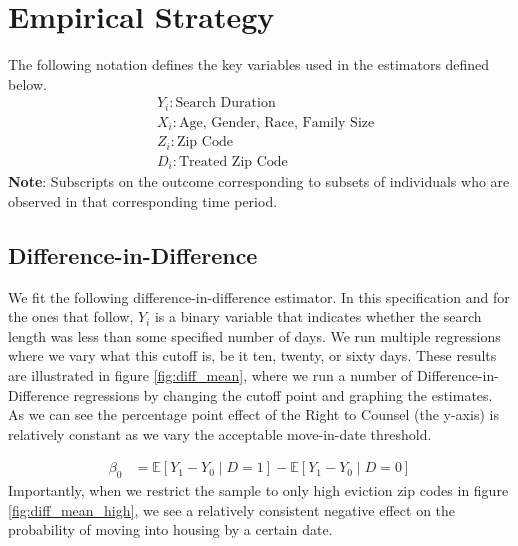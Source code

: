 \documentclass[a4paper,12pt]{article}
\begin{document}
 




\section{Empirical Strategy}
The following notation defines the key variables used in the estimators defined below. 
\begin{align*}
    &Y_i:  \textrm{Search Duration}\\
    &X_i: \textrm{Age, Gender, Race, Family Size}\\ 
    &Z_i: \textrm{Zip Code} \\
    &D_i: \textrm{Treated Zip Code}
\end{align*}
\textbf{Note}: Subscripts on the outcome corresponding to subsets of individuals who are observed in that corresponding time period. 

\subsection{Difference-in-Difference}

We fit the following difference-in-difference estimator. In this specification and for the ones that follow, $Y_i$ is a binary variable that indicates whether the search length was less than some specified number of days. We run multiple regressions where we vary what this cutoff is, be it ten, twenty, or sixty days. These results are illustrated in figure \ref{fig:diff_mean}, where we run a number of Difference-in-Difference regressions by changing the cutoff point and graphing the estimates. As we can see the percentage point effect of the Right to Counsel (the y-axis) is relatively constant as we vary the acceptable move-in-date threshold.


\begin{align*}
    \beta_0 &= \mathbb{E}[Y_1 -Y_0 \mid D=1] -  \mathbb{E}[Y_1 - Y_0 \mid D=0] \end{align*}
Importantly, when we restrict the sample to only high eviction zip codes in figure \ref{fig:diff_mean_high}, we see a relatively consistent negative effect on the probability of moving into housing by a certain date.
\end{document}
